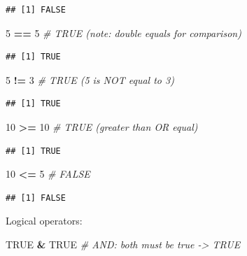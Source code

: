 \documentclass[
]{article}
\newenvironment{Shaded}{\begin{snugshade}}{\end{snugshade}}
\newcommand{\CommentTok}[1]{\textcolor[rgb]{0.56,0.35,0.01}{\textit{#1}}}
\newcommand{\ConstantTok}[1]{\textcolor[rgb]{0.56,0.35,0.01}{#1}}
\newcommand{\DecValTok}[1]{\textcolor[rgb]{0.00,0.00,0.81}{#1}}
\newcommand{\SpecialCharTok}[1]{\textcolor[rgb]{0.81,0.36,0.00}{\textbf{#1}}}
\begin{document}
\begin{verbatim}
## [1] FALSE
\end{verbatim}

\begin{Shaded}
\begin{Highlighting}[]
\DecValTok{5} \SpecialCharTok{==} \DecValTok{5} \CommentTok{\# TRUE (note: double equals for comparison)}
\end{Highlighting}
\end{Shaded}

\begin{verbatim}
## [1] TRUE
\end{verbatim}

\begin{Shaded}
\begin{Highlighting}[]
\DecValTok{5} \SpecialCharTok{!=} \DecValTok{3}        \CommentTok{\# TRUE (5 is NOT equal to 3)}
\end{Highlighting}
\end{Shaded}

\begin{verbatim}
## [1] TRUE
\end{verbatim}

\begin{Shaded}
\begin{Highlighting}[]
\DecValTok{10} \SpecialCharTok{\textgreater{}=} \DecValTok{10}      \CommentTok{\# TRUE (greater than OR equal)}
\end{Highlighting}
\end{Shaded}

\begin{verbatim}
## [1] TRUE
\end{verbatim}

\begin{Shaded}
\begin{Highlighting}[]
\DecValTok{10} \SpecialCharTok{\textless{}=} \DecValTok{5}       \CommentTok{\# FALSE}
\end{Highlighting}
\end{Shaded}

\begin{verbatim}
## [1] FALSE
\end{verbatim}

Logical operators:

\begin{Shaded}
\begin{Highlighting}[]
\ConstantTok{TRUE} \SpecialCharTok{\&} \ConstantTok{TRUE}   \CommentTok{\# AND: both must be true {-}\textgreater{} TRUE}
\end{Highlighting}
\end{Shaded}
\end{document}
